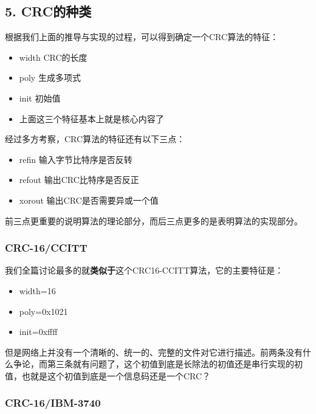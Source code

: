 \documentclass[
]{article}
\begin{document}
\hypertarget{header-n273}{%
\subsection{5. CRC的种类}\label{header-n273}}

根据我们上面的推导与实现的过程，可以得到确定一个CRC算法的特征：

\begin{itemize}
\item
  width CRC的长度
\item
  poly 生成多项式
\item
  init 初始值
\item
  上面这三个特征基本上就是核心内容了
\end{itemize}

经过多方考察，CRC算法的特征还有以下三点：

\begin{itemize}
\item
  refin 输入字节比特序是否反转
\item
  refout 输出CRC比特序是否反正
\item
  xorout 输出CRC是否需要异或一个值
\end{itemize}

前三点更重要的说明算法的理论部分，而后三点更多的是表明算法的实现部分。

\hypertarget{header-n293}{%
\subsubsection{CRC-16/CCITT}\label{header-n293}}

我们全篇讨论最多的就\textbf{类似于}这个CRC16-CCITT算法，它的主要特征是：

\begin{itemize}
\item
  width=16
\item
  poly=0x1021
\item
  init=0xffff
\end{itemize}

但是网络上并没有一个清晰的、统一的、完整的文件对它进行描述。前两条没有什么争论，而第三条就有问题了，这个初值到底是长除法的初值还是串行实现的初值，也就是这个初值到底是一个信息码还是一个CRC？

\hypertarget{header-n303}{%
\subsubsection{CRC-16/IBM-3740}\label{header-n303}}
\end{document}

